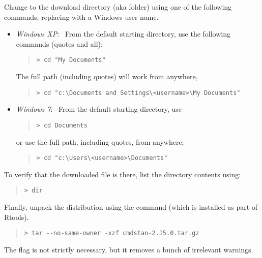 Change to the download directory (aka folder) using one of the
following commands, replacing  with
a Windows user name.
%
\begin{itemize}
\item \emph{Windows XP}: \ From the default starting directory, use
the following commands (quotes and all):
\begin{quote}
\begin{Verbatim}[fontshape=sl,fontsize=\small]
> cd "My Documents"
\end{Verbatim}
\end{quote}
%
The full path (including quotes) will work from anywhere,
\begin{quote}
\begin{Verbatim}[fontshape=sl,fontsize=\small]
> cd "c:\Documents and Settings\<username>\My Documents"
\end{Verbatim}
\end{quote}
\item \emph{Windows 7}:  \  From the default starting directory, use
\begin{quote}
\begin{Verbatim}[fontshape=sl,fontsize=\small]
> cd Documents
\end{Verbatim}
\end{quote} 
or use the full path, including quotes, from anywhere,
\begin{quote}
\begin{Verbatim}[fontshape=sl,fontsize=\small]
> cd "c:\Users\<username>\Documents"
\end{Verbatim}
\end{quote}
\end{itemize}
%
To verify that the downloaded \CmdStan {} file is there,
list the directory contents using:
%
\begin{quote}
\begin{Verbatim}[fontshape=sl,fontsize=\small]
> dir
\end{Verbatim}
\end{quote}

Finally, unpack the distribution using the  command (which
is installed as part of Rtools).
%
\begin{quote}
\begin{Verbatim}[fontshape=sl,fontsize=\small]
> tar --no-same-owner -xzf cmdstan-2.15.0.tar.gz 
\end{Verbatim}
\end{quote}
%
The  flag is not strictly necessary,
but it removes a bunch of irrelevant warnings.


